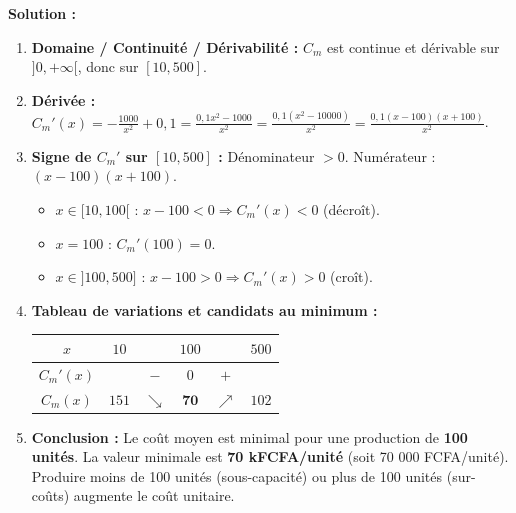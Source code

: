 \documentclass[11pt]{article}
\begin{document}
\begin{exoresolu}
\textbf{Solution :}
\begin{enumerate}
    \item \textbf{Domaine / Continuité / Dérivabilité :} $C_m$ est continue et dérivable sur $]0, +\infty[$, donc sur $[10, 500]$.
    \item \textbf{Dérivée :} $C_m'(x) = -\frac{1000}{x^2} + 0,1 = \frac{0,1x^2 - 1000}{x^2} = \frac{0,1(x^2 - 10000)}{x^2} = \frac{0,1(x-100)(x+100)}{x^2}$.
    \item \textbf{Signe de $C_m'$ sur $[10, 500]$ :} Dénominateur $>0$. Numérateur : $(x-100)(x+100)$.
        \begin{itemize}
            \item $x \in [10, 100[$ : $x-100 < 0 \Rightarrow C_m'(x) < 0$ (décroît).
            \item $x = 100$ : $C_m'(100) = 0$.
            \item $x \in ]100, 500]$ : $x-100 > 0 \Rightarrow C_m'(x) > 0$ (croît).
        \end{itemize}
    \item \textbf{Tableau de variations et candidats au minimum :}
    \begin{center}
    \begin{tabular}{|c|ccccc|}\hline
    $x$ & $10$ & & $100$ & & $500$ \\ \hline
    $C_m'(x)$ & & $-$ & $0$ & $+$ & \\ \hline
    $C_m(x)$ & $151$ & $\searrow$ & $\mathbf{70}$ & $\nearrow$ & $102$ \\ \hline
    \end{tabular}
    \end{center}
    \item \textbf{Conclusion :} Le coût moyen est minimal pour une production de \textbf{100 unités}. La valeur minimale est \textbf{70 kFCFA/unité} (soit 70 000 FCFA/unité). Produire moins de 100 unités (sous-capacité) ou plus de 100 unités (sur-coûts) augmente le coût unitaire.
\end{enumerate}
\end{exoresolu}
\end{document}
